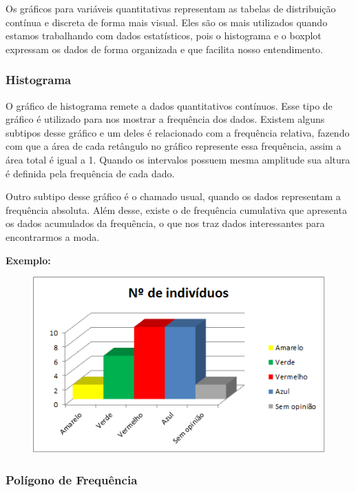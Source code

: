 \documentclass[
	12pt,				%
	oneside,			%
	a4paper,			%
	english,			%
	french,				%
	spanish,			%
	brazil,				%
	]{abntex2}
\begin{document}
Os gráficos para variáveis quantitativas representam as tabelas de distribuição contínua e discreta de forma mais visual. Eles são os mais utilizados quando estamos trabalhando com dados estatísticos, pois o histograma e o boxplot expressam os dados de forma organizada e que facilita nosso entendimento.\cite{wiki}

\subsubsection{Histograma}

O gráfico de histograma remete a dados quantitativos contínuos. Esse tipo de gráfico é
utilizado para nos mostrar a frequência dos dados. Existem alguns subtipos desse gráfico
e um deles é relacionado com a frequência relativa, fazendo com que a área de cada
retângulo no gráfico represente essa frequência, assim a área total é igual a 1. Quando os
intervalos possuem mesma amplitude sua altura é definida pela frequência de cada dado.\cite{histograma}

Outro subtipo desse gráfico é o chamado usual, quando os dados representam a
frequência absoluta. Além desse, existe o de frequência cumulativa que apresenta os
dados acumulados da frequência, o que nos traz dados interessantes para encontrarmos a
moda.

\textbf{Exemplo:}

\begin{figure}[H]
\begin{center}

\includegraphics[scale=0.8]{grafico7.jpg}  

\end{center}
\end{figure}

\subsubsection{Polígono de Frequência}
\end{document}
